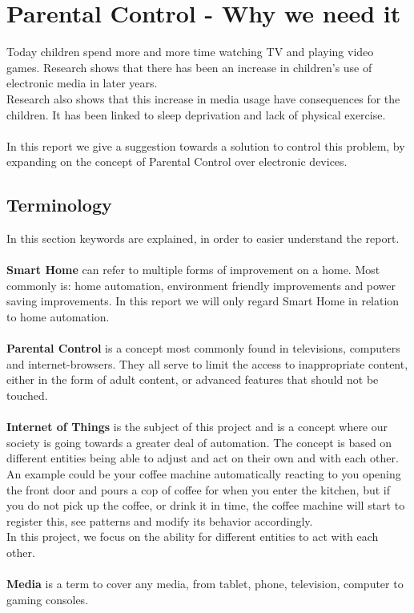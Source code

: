 \chapter{Parental Control - Why we need it} 
Today children spend more and more time watching TV and playing video games. Research shows that there has been an increase in children's use of electronic media in later years. \citep{sundhedsstyrelsen}\\
Research also shows that this increase in media usage have consequences for the children. It has been linked to sleep deprivation\citep{bmcPublicHealth} and lack of physical exercise\citep{bmcPublicHealth}.\\
\\
In this report we give a suggestion towards a solution to control this problem, by expanding on the concept of Parental Control over electronic devices.

\section{Terminology}
In this section keywords are explained, in order to easier understand the report.\\
\\
\textbf{Smart Home} can refer to multiple forms of improvement on a home. Most commonly is: home automation, environment friendly improvements and power saving improvements. In this report we will only regard Smart Home in relation to home automation.\\
\\
\textbf{Parental Control} is a concept most commonly found in televisions, computers and internet-browsers. They all serve to limit the access to inappropriate content, either in the form of adult content, or advanced features that should not be touched.\\
\\
\textbf{Internet of Things} is the subject of this project and is a concept where our society is going towards a greater deal of automation. The concept is based on different entities being able to adjust and act on their own and with each other. An example could be your coffee machine automatically reacting to you opening the front door and pours a cop of coffee for when you enter the kitchen, but if you do not pick up the coffee, or drink it in time, the coffee machine will start to register this, see patterns and modify its behavior accordingly.\citep{internetOfThings}\\
In this project, we focus on the ability for different entities to act with each other. \\
\\
\textbf{Media} is a term to cover any media, from tablet, phone, television, computer to gaming consoles.

